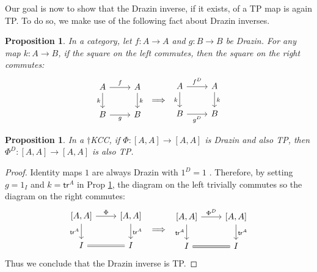 \documentclass[submission,copyright,creativecommons]{eptcs}
\newtheorem{proposition}[observation]{Proposition}
\begin{document}
Our goal is now to show that the Drazin inverse, if it exists, of a TP map is again TP. To do so, we make use of the following fact about Drazin inverses. 

\begin{proposition} \label{Drazin-commuting} \cite[Prop 3.10]{cockett2024drazin} In a category, let $f: A \to A$ and $g: B \to B$ be Drazin. For any map $k: A \to B$, if the square on the left commutes, then the square on the right commutes: 
\vspace{-0.3cm}
\[ \begin{array}[c]{c} \begin{tikzcd}
	A & A \\
	B & B
	\arrow["f", from=1-1, to=1-2]
	\arrow["k"', from=1-1, to=2-1]
	\arrow["k", from=1-2, to=2-2]
	\arrow["g"', from=2-1, to=2-2]
\end{tikzcd} \end{array} \Longrightarrow \begin{array}[c]{c} \begin{tikzcd}
	A & A \\
	B & B
	\arrow["f^D", from=1-1, to=1-2]
	\arrow["k"', from=1-1, to=2-1]
	\arrow["k", from=1-2, to=2-2]
	\arrow["g^D"', from=2-1, to=2-2]
\end{tikzcd} \end{array} \]
\end{proposition}

\begin{proposition}\label{prop:DrazinTP} In a $\dagger$KCC, if $\Phi: {[A,A]} \to [A,A]$ is Drazin and also TP, then $\Phi^D: {[A,A]} \to {[A,A]}$ is also TP.
\end{proposition}
\begin{proof} Identity maps $1$ are always Drazin with $1^D = 1$ \cite[Lem 3.6]{cockett2024drazin}. Therefore, by setting $g=1_I$ and $k=\mathsf{tr}^A$ in Prop \ref{Drazin-commuting}, the diagram on the left trivially commutes so the diagram on the right commutes: 
\[\begin{array}[c]{c} \begin{tikzcd}
	{[A,A]} & {[A,A]} \\
	I & I
	\arrow["\Phi", from=1-1, to=1-2]
	\arrow["{\mathsf{tr}^A}"', from=1-1, to=2-1]
	\arrow["{\mathsf{tr}^A}", from=1-2, to=2-2]
	\arrow[from=2-1, to=2-2, equal]
\end{tikzcd} \end{array} \Longrightarrow \begin{array}[c]{c}\begin{tikzcd}
	{[A,A]} & {[A,A]} \\
	I & I
	\arrow["\Phi^D", from=1-1, to=1-2]
	\arrow["{\mathsf{tr}^A}"', from=1-1, to=2-1]
	\arrow["{\mathsf{tr}^A}", from=1-2, to=2-2]
	\arrow[from=2-1, to=2-2, equal]
\end{tikzcd} \end{array} \]
Thus we conclude that the Drazin inverse is TP. 
\end{proof}
\end{document}
